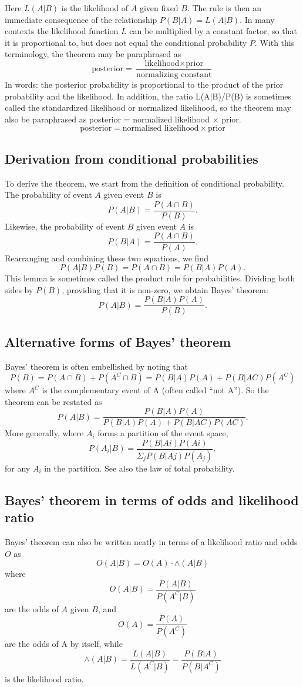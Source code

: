 Here $L(A|B)$ is the likelihood of $A$ given fixed $B$. The rule is then an immediate consequence of the relationship $P(B|A) = L(A|B)$. In many contexts
the likelihood function $L$ can be multiplied by a constant factor, so that it is
proportional to, but does not equal the conditional probability $P$.
With this terminology, the theorem may be paraphrased as
$$
\textrm{posterior} = \frac{\textrm{likelihood}\times\textrm{prior}}{\textrm{normalizing constant}}
$$
In words: the posterior probability is proportional to the product of the
prior probability and the likelihood.
In addition, the ratio L(A|B)/P(B) is sometimes called the standardized
likelihood or normalized likelihood, so the theorem may also be paraphrased as
posterior = normalized likelihood × prior.
$$
\textrm{posterior} = \textrm{normalised likelihood}\times\textrm{prior}
$$


\subsection{Derivation from conditional probabilities}

To derive the theorem, we start from the definition of conditional probability.
The probability of event $A$ given event $B$ is
$$P(A|B) = \frac{P (A\cap B)}{P (B)}.$$
Likewise, the probability of event $B$ given event $A$ is
$$P(B|A) = \frac{P (A\cap B)}{P (A)}.$$
Rearranging and combining these two equations, we find
$$P(A|B) P(B) = P(A \cap  B) = P(B|A) P(A).$$
This lemma is sometimes called the product rule for probabilities. Dividing
both sides by $P(B)$, providing that it is non-zero, we obtain Bayes' theorem:
$$P(A|B) = \frac{P (B|A) P (A)}{P (B)}.$$

\subsection{Alternative forms of Bayes' theorem}
Bayes' theorem is often embellished by noting that
$$P(B) = P(A \cap  B) + P(A^C \cap  B) = P(B|A)P(A) + P(B|AC )P(A^C )$$
where $A^C$ is the complementary event of A (often called ``not A''). So the
theorem can be restated as
$$P(A|B) = \frac{P (B|A) P (A)}{P (B|A)P (A)+P (B|AC)P (AC )}.$$
More generally, where $A_i$ forms a partition of the event space,
$$P(A_i|B) = \frac{P (B|Ai) P (Ai)}{\Sigma_j P (B|Aj ) P (A_j )},$$
for any $A_i$ in the partition.
See also the law of total probability.


\subsection{Bayes' theorem in terms of odds and likelihood ratio}
Bayes' theorem can also be written neatly in terms of a likelihood ratio and
odds $O$ as
$$O(A|B) = O(A) \cdot \wedge  (A|B)$$
where
$$O(A|B) = \frac{P (A|B)}{P (A^C |B)}$$
are the odds of $A$ given $B$, and 
$$O(A) = \frac{P (A)}{P (A^C)}$$
are the odds of A by itself,
while 
$$\wedge (A|B) = \frac{L(A|B)}{L(A^C |B)} =\frac{P (B|A)}{P (B|A^C)}$$
is the likelihood ratio.


